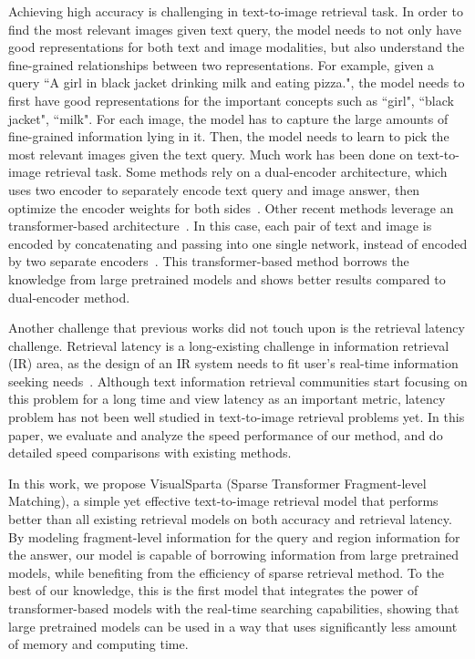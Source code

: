 \documentclass[11pt,a4paper]{article}
\begin{document}
Achieving high accuracy is challenging in text-to-image retrieval task. In order to find the most relevant images given text query, the model needs to not only have good representations for both text and image modalities, but also understand the fine-grained relationships between two representations. For example, given a query ``A girl in black jacket drinking milk and eating pizza.", the model needs to first have good representations for the important concepts such as ``girl", ``black jacket", ``milk". For each image, the model has to capture the large amounts of fine-grained information lying in it. Then, the model needs to learn to pick the most relevant images given the text query. Much work has been done on text-to-image retrieval task. Some methods rely on a dual-encoder architecture, which uses two encoder to separately encode text query and image answer, then optimize the encoder weights for both sides~\cite{faghri2017vse++,lee2018stacked,wang2019position}. Other recent methods leverage an transformer-based architecture~\cite{devlin2018bert,yang2019xlnet}. In this case, each pair of text and image is encoded by concatenating and passing into one single network, instead of encoded by two separate encoders~\cite{lu202012,li2020oscar}. This transformer-based method borrows the knowledge from large pretrained models and shows better results compared to dual-encoder method.



Another challenge that previous works did not touch upon is the retrieval latency challenge. Retrieval latency is a long-existing challenge in information retrieval (IR) area, as the design of an IR system needs to fit user's real-time information seeking needs~\cite{manning2008introduction}. Although text information retrieval communities start focusing on this problem for a long time and view latency as an important metric, latency problem has not been well studied in text-to-image retrieval problems yet. In this paper, we evaluate and analyze the speed performance of our method, and do detailed speed comparisons with existing methods. 



In this work, we propose VisualSparta (Sparse Transformer Fragment-level Matching), a simple yet effective text-to-image retrieval model that performs better than all existing retrieval models on both accuracy and retrieval latency. By modeling fragment-level information for the query and region information for the answer, our model is capable of borrowing information from large pretrained models, while benefiting from the efficiency of sparse retrieval method. To the best of our knowledge, this is the first model that integrates the power of transformer-based models with the real-time searching capabilities, showing that large pretrained models can be used in a way that uses significantly less amount of memory and computing time. 
\end{document}
